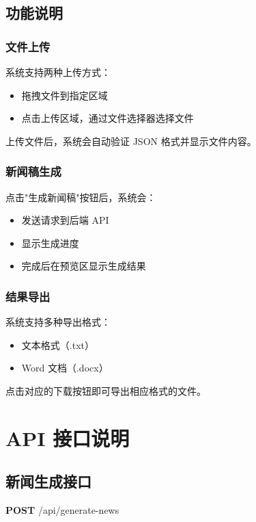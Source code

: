 \documentclass[a4paper, 12pt]{article}
\begin{document}
\subsection{功能说明}

\subsubsection{文件上传}
系统支持两种上传方式：
\begin{itemize}
    \item 拖拽文件到指定区域
    \item 点击上传区域，通过文件选择器选择文件
\end{itemize}

上传文件后，系统会自动验证 JSON 格式并显示文件内容。

\subsubsection{新闻稿生成}
点击"生成新闻稿"按钮后，系统会：
\begin{itemize}
    \item 发送请求到后端 API
    \item 显示生成进度
    \item 完成后在预览区显示生成结果
\end{itemize}

\subsubsection{结果导出}
系统支持多种导出格式：
\begin{itemize}
    \item 文本格式（.txt）
    \item Word 文档（.docx）
\end{itemize}

点击对应的下载按钮即可导出相应格式的文件。

\section{API 接口说明}

\subsection{新闻生成接口}
\begin{tcolorbox}[colback=gray!5,colframe=gray!50,title=API 路径]
\textbf{POST} /api/generate-news
\end{tcolorbox}
\end{document}
